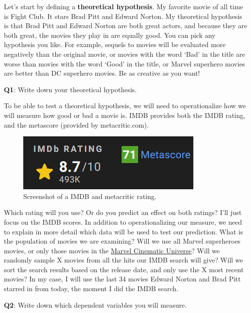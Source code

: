 \documentclass[
  oneside]{book}
\begin{document}
Let's start by defining a \textbf{theoretical hypothesis}. My favorite movie of all time is Fight Club. It stars Brad Pitt and Edward Norton. My theoretical hypothesis is that Brad Pitt and Edward Norton are both great actors, and because they are both great, the movies they play in are equally good. You can pick any hypothesis you like. For example, sequels to movies will be evaluated more negatively than the original movie, or movies with the word `Bad' in the title are worse than movies with the word `Good' in the title, or Marvel superhero movies are better than DC superhero movies. Be as creative as you want!

\textbf{Q1}: Write down your theoretical hypothesis.

To be able to test a theoretical hypothesis, we will need to operationalize how we will measure how good or bad a movie is. IMDB provides both the IMDB rating, and the metascore (provided by metacritic.com).



\begin{figure}

{\centering \includegraphics[width=0.4\linewidth]{images/imdbrating} 

}

\caption{Screenshot of a IMDB and metacritic rating.}\label{fig:imdbrating}
\end{figure}

Which rating will you use? Or do you predict an effect on both ratings? I'll just focus on the IMDB scores. In addition to operationalizing our measure, we need to explain in more detail which data will be used to test our prediction. What is the population of movies we are examining? Will we use all Marvel superheroes movies, or only those movies in the \href{https://en.wikipedia.org/wiki/List_of_Marvel_Cinematic_Universe_films}{Marvel Cinematic Universe}? Will we randomly sample X movies from all the hits our IMDB search will give? Will we sort the search results based on the release date, and only use the X most recent movies? In my case, I will use the last 34 movies Edward Norton and Brad Pitt starred in from today, the moment I did the IMDB search.

\textbf{Q2}: Write down which dependent variables you will measure.
\end{document}
